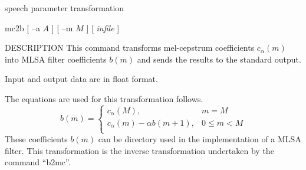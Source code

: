 % 
% 
% 
% 
%                                                                        
%
%
{speech parameter transformation}

\begin{synopsis}
 \item [mc2b] [ --a $A$ ] [ --m $M$ ] [ {\em infile} ]
\end{synopsis}

\begin{qsection}{DESCRIPTION}
This command transforms mel-cepstrum coefficients $c_\alpha(m)$ 
into MLSA filter coefficients $b(m)$ and sends the results
to the standard output.
\par
Input and output data are in float format.
\par
The equations are used for this transformation follows.
\begin{displaymath}
b(m) = \left\{
	\begin{array}{ll}
	  c_\alpha(M), & m=M \\
	  c_\alpha(m) - \alpha b(m+1), & 0 \leq m < M \\
	\end{array} \right.
\end{displaymath}
These coefficients $b(m)$ can be directory used in the
implementation of a MLSA filter.
This transformation is the inverse transformation undertaken
by the command ``b2mc''.
\end{qsection}

